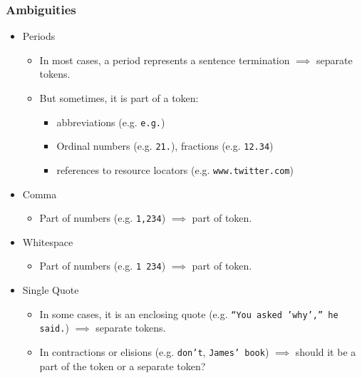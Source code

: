             \subsubsection{Ambiguities} %
                \begin{itemize}
                	\item Periods
                		\begin{itemize}
                			\item In most cases, a period represents a sentence termination \( \implies \) separate tokens.
                			\item But sometimes, it is part of a token:
                				\begin{itemize}
                					\item abbreviations (e.g. \texttt{e.g.})
                					\item Ordinal numbers (e.g. \texttt{21.}), fractions (e.g. \texttt{12.34})
                					\item references to resource locators (e.g. \texttt{www.twitter.com})
                				\end{itemize}
                		\end{itemize}
                	\item Comma
                		\begin{itemize}
                			\item Part of numbers (e.g. \texttt{1,234}) \( \implies \) part of token.
                		\end{itemize}
                	\item Whitespace
                		\begin{itemize}
                			\item Part of numbers (e.g. \texttt{1 234}) \( \implies \) part of token.
                		\end{itemize}
                	\item Single Quote
                		\begin{itemize}
                			\item In some cases, it is an enclosing quote (e.g. \texttt{\enquote{You asked 'why',} he said.}) \(\implies\) separate tokens.
                			\item In contractions or elisions (e.g. \texttt{don't}, \texttt{James' book}) \(\implies\) should it be a part of the token or a separate token? 
                		\end{itemize}

\end{itemize}
